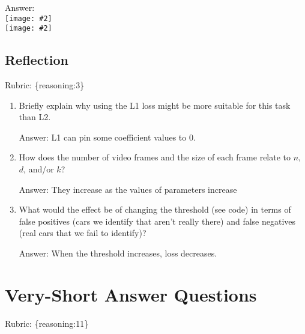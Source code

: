 \documentclass{article}
\def\rubric#1{\gre{Rubric: \{#1\}}}{}
\def\ans#1{\par\gre{Answer: #1}}
\def\gre#1{{\color{gre}#1}}
\newcommand{\fig}[2]{\texttt{[image: \#2]}}
\def\enum#1{\begin{enumerate}#1\end{enumerate}}
\begin{document}
\ans{}\\
\fig{0.8}{../figs/pca_1}\\
\fig{0.6}{../figs/pca_2}

\subsection{Reflection}
\rubric{reasoning:3}

\enum{
\item Briefly explain why using the L1 loss might be more suitable for this task than L2. 
\ans{L1 can pin some coefficient values to 0.}
\item How does the number of video frames and the size of each frame relate to $n$, $d$, and/or $k$?
\ans{They increase as the values of parameters increase}
\item What would the effect be of changing the threshold (see code) in terms of false positives (cars we identify that aren't really there) and false negatives (real cars that we fail to identify)?
\ans{When the threshold increases, loss decreases.}
}

\section{Very-Short Answer Questions}
\rubric{reasoning:11}
\end{document}
